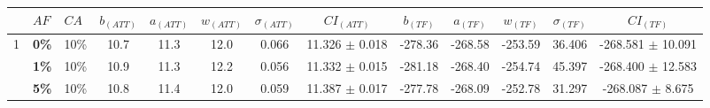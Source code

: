 \begin{sidewaystable}
\begin{itemize}[noitemsep]
    \end{itemize}
    \label{table:pm1}
\end{sidewaystable}


\begin{sidewaystable}
    \hspace*{-0.5cm}
    \begin{tabular}{|l|l|l||c|c|c|c|c|c|c|c|c|c|}
    \hline
    ~ & $AF$ & $CA$ & $b_{(ATT)}$ & $a_{(ATT)}$ & $w_{(ATT)}$ & $\sigma_{(ATT)}$ & $CI_{(ATT)}$ & $b_{(TF)}$ & $a_{(TF)}$ & $w_{(TF)}$ & $\sigma_{(TF)}$ & $CI_{(TF)}$\\
    \hline
    1 & \textbf{0\%} & 10\% & 10.7 & 11.3 & 12.0 & 0.066 & 11.326 $\pm$ 0.018 & -278.36 & -268.58 & -253.59 & 36.406 & -268.581 $\pm$ 10.091 \\
    ~ & \textbf{1\%} & 10\% & 10.9 & 11.3 & 12.2 & 0.056 & 11.332 $\pm$ 0.015 & -281.18 & -268.40 & -254.74 & 45.397 & -268.400 $\pm$ 12.583 \\
    ~ & \textbf{5\%} & 10\% & 10.8 & 11.4 & 12.0 & 0.059 & 11.387 $\pm$ 0.017 & -277.78 & -268.09 & -252.78 & 31.297 & -268.087 $\pm$ 8.675 \\ 
    \hline
    

\end{tabular}
\end{sidewaystable}
